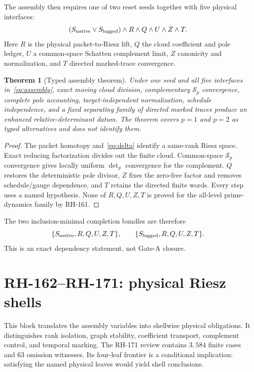 \documentclass[11pt]{article}
\newtheorem{theorem}{Theorem}[section]
\theoremstyle{definition}
\theoremstyle{remark}
\begin{document}
The assembly then requires one of two reset seeds together with five physical
interfaces:
\begin{equation}\label{eq:assembly}
 (S_{\rm native}\vee S_{\rm lagged})\wedge R\wedge Q\wedge U\wedge Z\wedge T.
\end{equation}
Here $R$ is the physical packet-to-Riesz lift, $Q$ the cloud coefficient and
pole ledger, $U$ a common-space Schatten complement limit, $Z$ canonicity and
normalization, and $T$ directed marked-trace convergence.

\begin{theorem}[Typed assembly theorem]\label{thm:assembly}
Under one seed and all five interfaces in~\eqref{eq:assembly}, exact moving
cloud division, complementary $\mathcal S_p$ convergence, complete pole
accounting, target-independent normalization, schedule independence, and a
fixed separating family of directed marked traces produce an enhanced
relative-determinant datum.  The theorem covers $p=1$ and $p=2$ as typed
alternatives and does not identify them.
\end{theorem}
\begin{proof}
The packet homotopy and~\eqref{eq:delta} identify a same-rank Riesz space.
Exact reducing factorization divides out the finite cloud.  Common-space
$\mathcal S_p$ convergence gives locally uniform $\det_p$ convergence for the
complement.  $Q$ restores the deterministic pole divisor, $Z$ fixes the
zero-free factor and removes schedule/gauge dependence, and $T$ retains the
directed finite words.  Every step uses a named hypothesis.  None of
$R,Q,U,Z,T$ is proved for the all-level prime-dynamics family by RH-161.
\end{proof}

The two inclusion-minimal completion bundles are therefore
\[
 \{S_{\rm native},R,Q,U,Z,T\},\qquad
 \{S_{\rm lagged},R,Q,U,Z,T\}.
\]
This is an exact dependency statement, not Gate-A closure.

\section{RH-162--RH-171: physical Riesz shells}

This block translates the assembly variables into shellwise physical
obligations.  It distinguishes rank isolation, graph stability, coefficient
transport, complement control, and temporal marking.  The RH-171 review
contains $3{,}584$ finite cases and $63$ omission witnesses.  Its four-leaf
frontier is a conditional implication: satisfying the named physical leaves
would yield shell conclusions.
\end{document}
